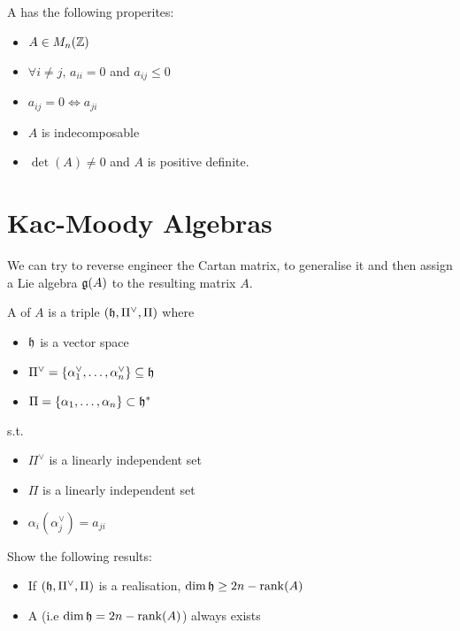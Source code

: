 \documentclass{article}
\begin{document}
\begin{prop}
A has the following properites: 
\begin{itemize}
    \item $A \in M_n(\mathbb{Z})$ 
    \item $\forall i \neq j, \, a_{ii}=0 $ and $a_{ij}\leq 0$ 
    \item $a_{ij}=0 \Leftrightarrow a_{ji}$ 
    \item $A$ is indecomposable
    \item $\det(A) \neq 0$ and $A$ is positive definite. 
\end{itemize}
\end{prop}

\section{Kac-Moody Algebras}

\begin{idea}
We can try to reverse engineer the Cartan matrix, to generalise it and then assign a Lie algebra $\mathfrak{g}(A)$ to the resulting matrix $A$. 
\end{idea}

\begin{definition}
A  of $A$ is a triple $(\mathfrak{h},\Pi^\vee,\Pi)$ where
\begin{itemize}
    \item $\mathfrak{h}$ is a vector space 
    \item $\Pi^\vee = \left\{ \alpha_1^\vee, \dots, \alpha^\vee_n \right\} \subseteq \mathfrak{h}$ 
    \item $\Pi = \left\{ \alpha_1, \dots, \alpha_n \right\} \subset \mathfrak{h}^\ast$
\end{itemize}
s.t. 
\begin{itemize}
    \item $\Pi^\vee$ is a linearly independent set 
    \item $\Pi$ is a linearly independent set 
    \item $\alpha_i(\alpha_j^\vee) = a_{ji}$
\end{itemize}
\end{definition}

\begin{ex}
Show the following results: 
\begin{itemize}
    \item If $(\mathfrak{h},\Pi^\vee,\Pi)$ is a realisation, $\dim \mathfrak{h} \geq 2n-\operatorname{rank}(A)$
    \item A  (i.e $\dim \mathfrak{h} = 2n-\operatorname{rank}(A)$) always exists
\end{itemize}
\end{ex}
\end{document}
